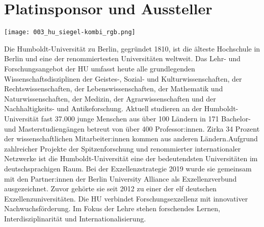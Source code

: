 \section*{Platinsponsor und Aussteller}

\vspace{-0.5cm}
\centerline{\texttt{[image: 003\_hu\_siegel-kombi\_rgb.png]}}
Die Humboldt-Universität zu Berlin, gegründet 1810, ist die älteste Hochschule in Berlin
und eine der renommiertesten Universitäten weltweit. Das Lehr- und Forschungsangebot der HU umfasst heute alle grundlegenden
Wissenschaftsdisziplinen der Geistes-, Sozial- und Kulturwissenschaften, der Rechtswissenschaften, der Lebenswissenschaften, der Mathematik und Naturwissenschaften, der Medizin, der Agrarwissenschaften und der Nachhaltigkeits- und Antikeforschung. Aktuell studieren an der Humboldt-Universität fast 37.000 junge Menschen aus über 100 Ländern in 171 Bachelor- und Masterstudiengängen betreut von über 400 Professor:innen. Zirka 34 Prozent der wissenschaftlichen Mitarbeiter:innen kommen aus anderen Ländern.Aufgrund zahlreicher Projekte der Spitzenforschung und renommierter internationaler Netzwerke ist die Humboldt-Universität eine der bedeutendsten Universitäten im deutschsprachigen Raum. Bei der Exzellenzstrategie 2019 wurde sie gemeinsam mit den Partner:innen der Berlin University Alliance als Exzellenzverbund ausgezeichnet. Zuvor gehörte sie seit 2012 zu einer der elf deutschen Exzellenzuniversitäten. Die HU verbindet Forschungsexzellenz mit innovativer Nachwuchsförderung. Im Fokus der Lehre stehen forschendes Lernen, Interdisziplinarität und Internationalisierung.
